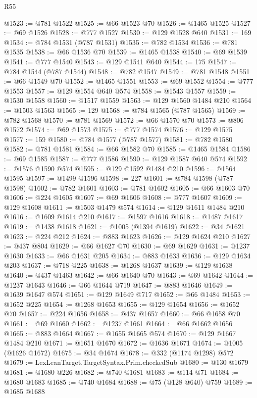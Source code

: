 \begin{lexlean}{R55}
\begin{coremodule}
@1523 := @781 @1522
@1525 := @66 @1523 @70
@1526 := @1465 @1525
@1527 := @69 @1526
@1528 := @777 @1527
@1530 := @129 @1528 @640
@1531 := 169
@1534 := @784 @1531 (@787 @1531)
@1535 := @782 @1534
@1536 := @781 @1535
@1538 := @66 @1536 @70
@1539 := @1465 @1538
@1540 := @69 @1539
@1541 := @777 @1540
@1543 := @129 @1541 @640
@1544 := 175
@1547 := @784 @1544 (@787 @1544)
@1548 := @782 @1547
@1549 := @781 @1548
@1551 := @66 @1549 @70
@1552 := @1465 @1551
@1553 := @69 @1552
@1554 := @777 @1553
@1557 := @129 @1554 @640 @574
@1558 := @1543 @1557
@1559 := @1530 @1558
@1560 := @1517 @1559
@1563 := @129 @1560 @1484 @210
@1564 := @1503 @1563
@1565 := 129
@1568 := @784 @1565 (@787 @1565)
@1569 := @782 @1568
@1570 := @781 @1569
@1572 := @66 @1570 @70
@1573 := @806 @1572
@1574 := @69 @1573
@1575 := @777 @1574
@1576 := @129 @1575
@1577 := 159
@1580 := @784 @1577 (@787 @1577)
@1581 := @782 @1580
@1582 := @781 @1581
@1584 := @66 @1582 @70
@1585 := @1465 @1584
@1586 := @69 @1585
@1587 := @777 @1586
@1590 := @129 @1587 @640 @574
@1592 := @1576 @1590 @574
@1595 := @129 @1592 @1484 @210
@1596 := @1564 @1595
@1597 := @1499 @1596
@1598 := 227
@1601 := @784 @1598 (@787 @1598)
@1602 := @782 @1601
@1603 := @781 @1602
@1605 := @66 @1603 @70
@1606 := @224 @1605
@1607 := @69 @1606
@1608 := @777 @1607
@1609 := @129 @1608
@1611 := @1503 @1479 @574
@1614 := @129 @1611 @1484 @210
@1616 := @1609 @1614 @210
@1617 := @1597 @1616
@1618 := @1487 @1617
@1619 := @1438 @1618
@1621 := @1005 (@1394 @1619)
@1622 := @34 @1621
@1623 := @224 @212
@1624 := @883 @1623
@1626 := @129 @1624 @210
@1627 := @437 @804
@1629 := @66 @1627 @70
@1630 := @69 @1629
@1631 := @1237 @1630
@1633 := @66 @1631 @205
@1634 := @883 @1633
@1636 := @129 @1634 @203
@1637 := @718 @225
@1638 := @1268 @1637
@1639 := @129 @1638
@1640 := @437 @1463
@1642 := @66 @1640 @70
@1643 := @69 @1642
@1644 := @1237 @1643
@1646 := @66 @1644 @719
@1647 := @883 @1646
@1649 := @1639 @1647 @574
@1651 := @129 @1649 @717
@1652 := @66 @1484
@1653 := @1652 @225
@1654 := @1268 @1653
@1655 := @129 @1654
@1656 := @1652 @70
@1657 := @224 @1656
@1658 := @437 @1657
@1660 := @66 @1658 @70
@1661 := @69 @1660
@1662 := @1237 @1661
@1664 := @66 @1662 @1656
@1665 := @883 @1664
@1667 := @1655 @1665 @574
@1670 := @129 @1667 @1484 @210
@1671 := @1651 @1670
@1672 := @1636 @1671
@1674 := @1005 (@1626 @1672)
@1675 := @34 @1674
@1678 := @332 (@1174 @1298) @572
@1679 := LexLeanTarget.TargetSyntax.Prim.checkedSub
@1680 := @130 @1679
@1681 := @1680 @226
@1682 := @740 @1681
@1683 := @114 @71
@1684 := @1680 @1683
@1685 := @740 @1684
@1688 := @75 (@128 @640) @759
@1689 := @1685 @1688

\end{coremodule}
\end{lexlean}
